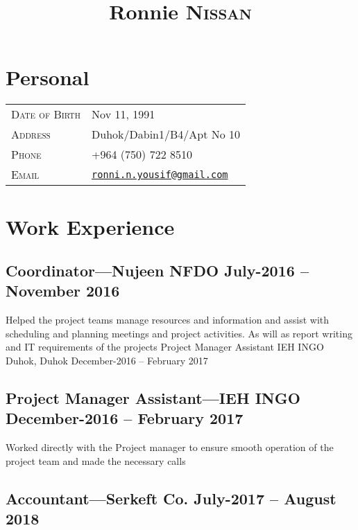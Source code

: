 \documentclass[11pt]{article}
\date{}
\title{\Huge Ronnie \textsc{Nissan}}
\begin{document}
\maketitle
\vspace{-15ex}
\section*{Personal}
\label{sec:org72b3c7e}
\begin{tabular}{p{10em}|l}
\textsc{Date of Birth} & Nov 11, 1991\\
\textsc{Address} & Duhok/Dabin1/B4/Apt No 10\\
\textsc{Phone} & +964 (750) 722 8510\\
\textsc{Email} & \href{mailto:christopherackerman104@gmail.com}{\texttt{ronni.n.yousif@gmail.com}}\\
\end{tabular}


\section*{Work Experience}
\label{sec:org2ea235a}

\subsection*{Coordinator---Nujeen NFDO \hfill July-2016 – November 2016}
\label{sec:orgd17e77a}

\noindent Helped the project teams manage resources and
information and assist with scheduling and planning
meetings and project activities. As will as report writing
and IT requirements of the projects
Project Manager Assistant
IEH INGO
Duhok, Duhok
December-2016 – February 2017

\subsection*{Project Manager Assistant---IEH INGO \hfill December-2016 – February 2017}
\label{sec:org177cd73}

\noindent Worked directly with the Project manager to ensure smooth
operation of the project team and made the necessary calls

\subsection*{Accountant---Serkeft Co. \hfill July-2017 – August 2018}
\label{sec:orgc321bcf}
\end{document}
